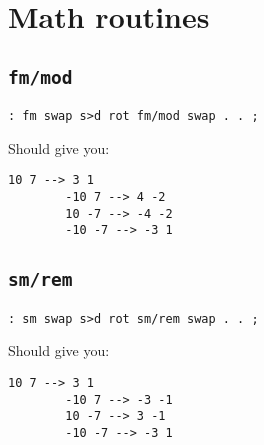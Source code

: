 \section{Math routines}



\subsection{\texttt{fm/mod}}

\begin{lstlisting}[frame=lines]
        : fm swap s>d rot fm/mod swap . . ; 
\end{lstlisting}

\noindent Should give you: 
\begin{lstlisting}[frame=lines]
        10 7 --> 3 1
        -10 7 --> 4 -2 
        10 -7 --> -4 -2
        -10 -7 --> -3 1
\end{lstlisting}


\subsection{\texttt{sm/rem}}

\begin{lstlisting}[frame=lines]
        : sm swap s>d rot sm/rem swap . . ; 
\end{lstlisting}

\noindent Should give you: 
\begin{lstlisting}[frame=lines]
        10 7 --> 3 1
        -10 7 --> -3 -1 
        10 -7 --> 3 -1
        -10 -7 --> -3 1
\end{lstlisting}
